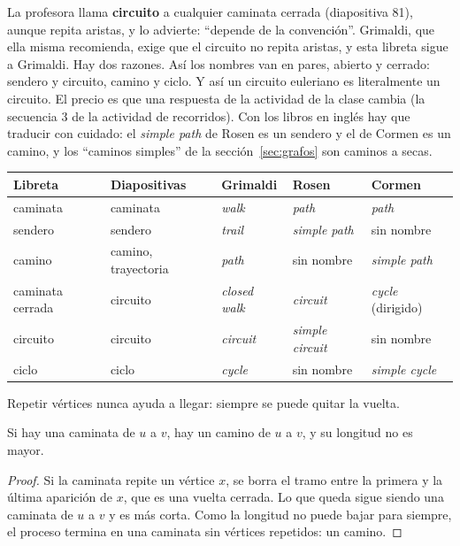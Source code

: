 \documentclass[11pt,letterpaper]{article}
\begin{document}
\begin{ojo}
  La profesora llama \textbf{circuito} a cualquier caminata cerrada
  (diapositiva 81), aunque repita aristas, y lo advierte: ``depende de
  la convención''. Grimaldi, que ella misma recomienda, exige que el
  circuito no repita aristas, y esta libreta sigue a Grimaldi. Hay dos
  razones. Así los nombres van en pares, abierto y cerrado:
  sendero y circuito, camino y ciclo. Y así un circuito euleriano es
  literalmente un circuito. El precio es que una respuesta de la
  actividad de la clase cambia (la secuencia 3 de la actividad de
  recorridos). Con los libros en inglés
  hay que traducir con cuidado: el \textit{simple path} de Rosen es un
  sendero y el de Cormen es un camino, y los ``caminos simples'' de la
  sección~\ref{sec:grafos} son caminos a secas.\par
  \vspace{6pt}
  {\centering\small
  \begin{tabular}{lllll}
    \toprule
    \textbf{Libreta} & \textbf{Diapositivas} & \textbf{Grimaldi}
      & \textbf{Rosen} & \textbf{Cormen} \\
    \midrule
    caminata & caminata & \textit{walk} & \textit{path}
      & \textit{path} \\
    sendero & sendero & \textit{trail} & \textit{simple path}
      & sin nombre \\
    camino & camino, trayectoria & \textit{path} & sin nombre
      & \textit{simple path} \\
    caminata cerrada & circuito & \textit{closed walk}
      & \textit{circuit} & \textit{cycle} (dirigido) \\
    circuito & circuito & \textit{circuit} & \textit{simple circuit}
      & sin nombre \\
    ciclo & ciclo & \textit{cycle} & sin nombre
      & \textit{simple cycle} \\
    \bottomrule
  \end{tabular}\par}
\end{ojo}

Repetir vértices nunca ayuda a llegar: siempre se puede quitar la
vuelta.

\begin{lema}
  \label{lem:caminata-camino}
  Si hay una caminata de $u$ a $v$, hay un camino de $u$ a $v$, y su
  longitud no es mayor.
\end{lema}

\begin{proof}
  Si la caminata repite un vértice $x$, se borra el tramo entre la
  primera y la última aparición de $x$, que es una vuelta cerrada. Lo
  que queda sigue siendo una caminata de $u$ a $v$ y es más corta. Como
  la longitud no puede bajar para siempre, el proceso termina en una
  caminata sin vértices repetidos: un camino.
\end{proof}
\end{document}
